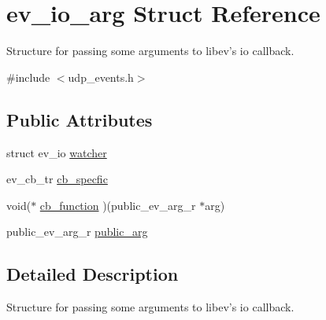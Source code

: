 \hypertarget{structev__io__arg}{\section{ev\-\_\-io\-\_\-arg \-Struct \-Reference}
\label{structev__io__arg}
}


\-Structure for passing some arguments to libev's io callback.  




{\ttfamily \#include $<$udp\-\_\-events.\-h$>$}

\subsection*{\-Public \-Attributes}
\begin{DoxyCompactItemize}
\item 
struct ev\-\_\-io \hyperlink{structev__io__arg_ac9df307e50111f96bcf5d726d54cb574}{watcher}
\item 
ev\-\_\-cb\-\_\-tr \hyperlink{structev__io__arg_af055bf020c5760fb46c3b6a158df561f}{cb\-\_\-specfic}
\item 
void($\ast$ \hyperlink{structev__io__arg_abaa257f67d6cfdbe32520b8cc4e8d3c5}{cb\-\_\-function} )(public\-\_\-ev\-\_\-arg\-\_\-r $\ast$arg)
\item 
public\-\_\-ev\-\_\-arg\-\_\-r \hyperlink{structev__io__arg_a18b44fe3cd02062cef68cfa6f029bda0}{public\-\_\-arg}
\end{DoxyCompactItemize}


\subsection{\-Detailed \-Description}
\-Structure for passing some arguments to libev's io callback. 


